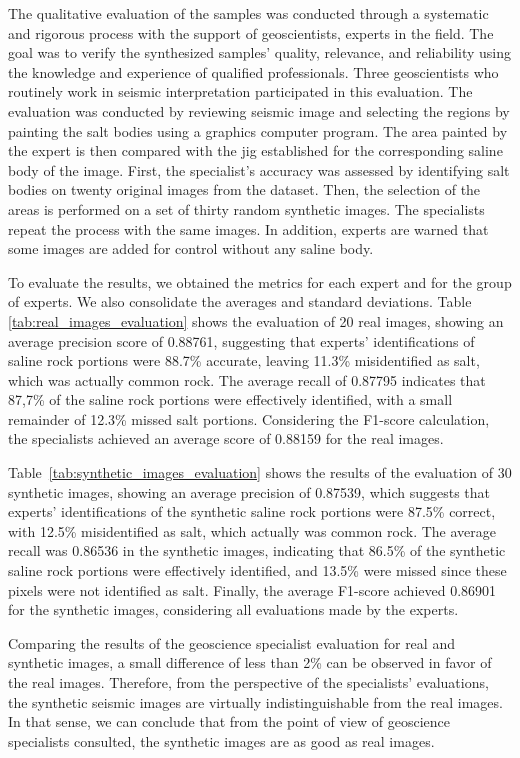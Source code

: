 \documentclass{ieeeaccess}
\begin{document}
The qualitative evaluation of the samples was conducted through a systematic and rigorous process with the support of geoscientists, experts in the field. The goal was to verify the synthesized samples' quality, relevance, and reliability using the knowledge and experience of qualified professionals. Three geoscientists who routinely work in seismic interpretation participated in this evaluation. The evaluation was conducted by reviewing seismic image and selecting the regions by painting the salt bodies using a graphics computer program. The area painted by the expert is then compared with the jig established for the corresponding saline body of the image. First, the specialist's accuracy was assessed by identifying salt bodies on twenty original images from the dataset. Then, the selection of the areas is performed on a set of thirty random synthetic images. The specialists repeat the process with the same images. In addition, experts are warned that some images are added for control without any saline body.

To evaluate the results, we obtained the metrics for each expert and for the group of experts. We also consolidate the averages and standard deviations. Table \ref{tab:real_images_evaluation} shows the evaluation of 20 real images, showing an average precision score of 0.88761, suggesting that experts' identifications of saline rock portions were 88.7\% accurate, leaving 11.3\% misidentified as salt, which was actually common rock. The average recall of 0.87795 indicates that 87,7\% of the saline rock portions were effectively identified, with a small remainder of 12.3\% missed salt portions. Considering the F1-score calculation, the specialists achieved an average score of 0.88159 for the real images.

Table~\ref{tab:synthetic_images_evaluation} shows the results of the evaluation of 30 synthetic images, showing an average precision of 0.87539, which suggests that experts' identifications of the synthetic saline rock portions were 87.5\% correct, with 12.5\% misidentified as salt, which actually was common rock. The average recall was 0.86536 in the synthetic images, indicating that 86.5\% of the synthetic saline rock portions were effectively identified, and 13.5\% were missed since these pixels were not identified as salt. Finally, the average F1-score achieved 0.86901 for the synthetic images, considering all evaluations made by the experts.

Comparing the results of the geoscience specialist evaluation for real and synthetic images, a small difference of less than 2\% can be observed in favor of the real images. Therefore, from the perspective of the specialists' evaluations, the synthetic seismic images are virtually indistinguishable from the real images. In that sense, we can conclude that from the point of view of geoscience specialists consulted, the synthetic images are as good as real images.
\end{document}
